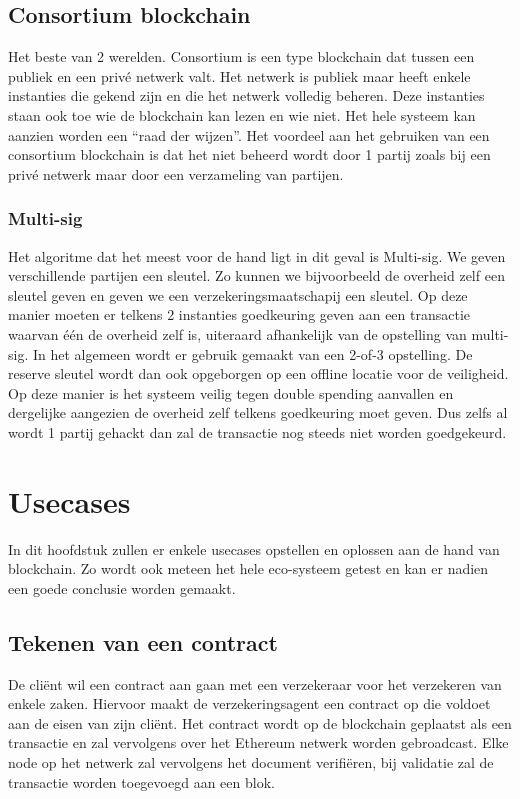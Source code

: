 \section{Consortium blockchain}
Het beste van 2 werelden. Consortium is een type blockchain dat tussen een publiek en een privé netwerk valt. Het netwerk is publiek maar heeft enkele instanties die gekend zijn en die het netwerk volledig beheren. Deze instanties staan ook toe wie de blockchain kan lezen en wie niet. Het hele systeem kan aanzien worden een ``raad der wijzen''. Het voordeel aan het gebruiken van een consortium blockchain is dat het niet beheerd wordt door 1 partij zoals bij een privé netwerk maar door een verzameling van partijen. 

\subsection{Multi-sig}
Het algoritme dat het meest voor de hand ligt in dit geval is Multi-sig. We geven verschillende partijen een sleutel. Zo kunnen we bijvoorbeeld de overheid zelf een sleutel geven en geven we een verzekeringsmaatschapij een sleutel. Op deze manier moeten er telkens 2 instanties goedkeuring geven aan een transactie waarvan één de overheid zelf is, uiteraard afhankelijk van de opstelling van multi-sig. In het algemeen wordt er gebruik gemaakt van een 2-of-3 opstelling. De reserve sleutel wordt dan ook opgeborgen op een offline locatie voor de veiligheid. Op deze manier is het systeem veilig tegen double spending aanvallen en dergelijke aangezien de overheid zelf telkens goedkeuring moet geven. Dus zelfs al wordt 1 partij gehackt dan zal de transactie nog steeds niet worden goedgekeurd. 

\chapter{Usecases}
\label{ch:usecases}
In dit hoofdstuk zullen er enkele usecases opstellen en oplossen aan de hand van blockchain. Zo wordt ook meteen het hele eco-systeem getest en kan er nadien een goede conclusie worden gemaakt.

\section{Tekenen van een contract}
De cliënt wil een contract aan gaan met een verzekeraar voor het verzekeren van enkele zaken. Hiervoor maakt de verzekeringsagent een contract op die voldoet aan de eisen van zijn cliënt. Het contract wordt op de blockchain geplaatst als een transactie en zal vervolgens over het Ethereum netwerk worden gebroadcast. Elke node op het netwerk zal vervolgens het document verifiëren, bij validatie zal de transactie worden toegevoegd aan een blok. 

